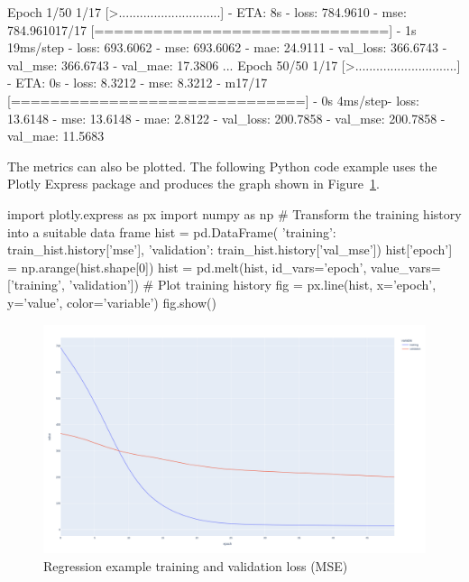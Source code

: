 \begin{samepage}
\begin{textcode}
Epoch 1/50
 1/17 [>.............................] - ETA: 8s - loss: 784.9610 - 
 mse: 784.961017/17 [==============================] - 1s 19ms/step - 
 loss: 693.6062 - mse: 693.6062 - mae: 24.9111 - val_loss: 366.6743 - 
 val_mse: 366.6743 - val_mae: 17.3806
...
Epoch 50/50
 1/17 [>.............................] - ETA: 0s - loss: 8.3212 - 
 mse: 8.3212 - m17/17 [==============================] - 0s 4ms/step- 
 loss: 13.6148 - mse: 13.6148 - mae: 2.8122 - val_loss: 200.7858 - 
 val_mse: 200.7858 - val_mae: 11.5683
\end{textcode}
\end{samepage}

The metrics can also be plotted. The following Python code example uses the Plotly Express package and produces the graph shown in Figure~\ref{fig:regressiontraining}.

\begin{samepage}
\begin{pythoncode}
import plotly.express as px
import numpy as np
# Transform the training history into a suitable data frame
hist = pd.DataFrame({
    'training':   train_hist.history['mse'],
    'validation': train_hist.history['val_mse']})
hist['epoch'] = np.arange(hist.shape[0])
hist = pd.melt(hist, id_vars='epoch', 
                     value_vars=['training', 'validation'])
# Plot training history
fig = px.line(hist, x='epoch', y='value', color='variable')
fig.show()
\end{pythoncode}
\end{samepage}

\begin{figure}
\centering
\includegraphics[width=.9\textwidth]{regression_training.png}
\caption{Regression example training and validation loss (MSE)}
\label{fig:regressiontraining}
\end{figure}

